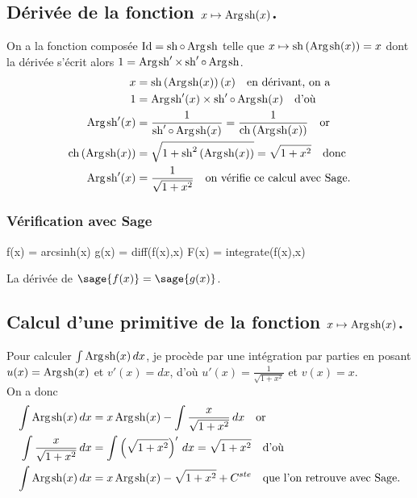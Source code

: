 \documentclass[a4paper,landscape,17pt]{extreport} %
\def\Id{\ensuremath{\mathrm{Id}}}
\renewcommand{\sinh}{\mathop{\mathrm{sh}}}
\renewcommand{\cosh}{\mathop{\mathrm{ch}}}
\renewcommand{\arg}{\mathop{\mathrm{Arg}}}
\begin{document}
\subsection{Dérivée de la fonction $x \mapsto \arg\mspace{-1mu}\sinh(x)$.\label{argsinh}}
On a la fonction composée $\Id = \sinh \circ \arg\mspace{-1mu}\sinh$ telle que $x\mapsto\sinh\left(\arg\mspace{-1mu}\sinh(x)\right)=x$ dont la dérivée s'écrit alors $1= \arg\mspace{-1mu}\sinh\nolimits' \times \sinh\nolimits'\circ\arg\mspace{-1mu}\sinh$.
\begin{align*}
x & =\sinh\left(\arg\mspace{-1mu}\sinh(x)\right)(x) \quad \textrm{en dérivant, on a}\\
1 & = \arg\mspace{-1mu}\sinh\nolimits'(x) \times \sinh\nolimits'\circ\arg\mspace{-1mu}\sinh(x) \quad \textrm{d'où}\\
\arg\mspace{-1mu}\sinh\nolimits'(x) & =\frac{1}{ \sinh\nolimits'\circ\arg\mspace{-1mu}\sinh(x)}=\frac{1}{ \cosh\left(\arg\mspace{-1mu}\sinh(x)\right)}\quad \textrm{or}\\
\cosh\left(\arg\mspace{-1mu}\sinh(x)\right) & = \sqrt{1+\sinh\nolimits^2\left(\arg\mspace{-1mu}\sinh(x)\right)}=\sqrt{1+x^2}\quad \textrm{donc}\\
\arg\mspace{-1mu}\sinh\nolimits'(x) & = \frac{1}{ \sqrt{1+x^2}}\quad \textrm{on vérifie ce calcul avec Sage.}
\end{align*}


\subsubsection{Vérification avec Sage}


\begin{sageblock}
    f(x) = arcsinh(x)
    g(x) = diff(f(x),x)
    F(x) = integrate(f(x),x)
\end{sageblock}

La dérivée de $\sage{f(x)} = \sage{g(x)} $.


\subsection{Calcul d'une primitive de la fonction  $x \mapsto \arg\mspace{-1mu}\sinh(x)$.}

Pour calculer $\int \arg\mspace{-1mu}\sinh(x) \, dx$, je procède par une intégration par parties en posant $u(x) = \arg\mspace{-1mu}\sinh(x)$ et $v'(x) = dx$, d'où $u'(x) = \frac{1}{ \sqrt{1+x^2}}$ et $ v(x) = x $. \\
On a donc
\begin{align*}
\int \arg\mspace{-1mu}\sinh(x) \, dx & = x \arg\mspace{-1mu}\sinh(x) - \int \frac{x}{ \sqrt{1+x^2}} \, dx \quad \textrm{or}\\
\int \frac{x}{ \sqrt{1+x^2}} \, dx & = \int \left(\sqrt{1+x^2}\right)' \, dx = \sqrt{1+x^2}  \quad \textrm{d'où}\\
\int \arg\mspace{-1mu}\sinh(x) \, dx & = x \arg\mspace{-1mu}\sinh(x) - \sqrt{1+x^2} + C^{ste} \quad \textrm{que l'on retrouve avec Sage.}
\end{align*}
\end{document}
